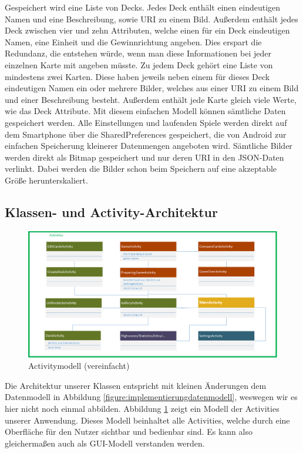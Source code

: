 Gespeichert wird eine Liste von Decks. Jedes Deck enthält einen eindeutigen Namen und eine Beschreibung, sowie URI zu einem Bild. Außerdem enthält jedes Deck zwischen vier und zehn Attributen, welche einen für ein Deck eindeutigen Namen, eine Einheit und die Gewinnrichtung angeben. Dies erspart die Redundanz, die entstehen würde, wenn man diese Informationen bei jeder einzelnen Karte mit angeben müsste. Zu jedem Deck gehört eine Liste von mindestens zwei Karten. Diese haben jeweils neben einem für dieses Deck eindeutigen Namen ein oder mehrere Bilder, welches aus einer URI zu einem Bild und einer Beschreibung besteht. Außerdem enthält jede Karte gleich viele Werte, wie das Deck Attribute. Mit diesem einfachen Modell können sämtliche Daten gespeichert werden. Alle Einstellungen und laufenden Spiele werden direkt auf dem Smartphone über die SharedPreferences gespeichert, die von Android zur einfachen Speicherung kleinerer Datenmengen angeboten wird. Sämtliche Bilder werden direkt als Bitmap gespeichert und nur deren URI in den JSON-Daten verlinkt. Dabei werden die Bilder schon beim Speichern auf eine akzeptable Größe herunterskaliert.

\subsection{Klassen- und Activity-Architektur}
\label{sec:implementierung:architektur:klassenmodell }

\begin{figure}[htp]
	\centering
  	\includegraphics[width=\textwidth]{img/modelle/Klassenmodell_Activities.png}
	\caption{Activitymodell (vereinfacht)}
	\label{figure:implementierungactivitymodell}
\end{figure}

Die Architektur unserer Klassen entspricht mit kleinen Änderungen dem Datenmodell in Abbildung \ref{figure:implementierungdatenmodell}, weswegen wir es hier nicht noch einmal abbilden. Abbildung \ref{figure:implementierungactivitymodell} zeigt ein Modell der Activities unserer Anwendung. Dieses Modell beinhaltet alle Activities, welche durch eine Oberfläche für den Nutzer sichtbar und bedienbar sind. Es kann also gleichermaßen auch als GUI-Modell verstanden werden.


